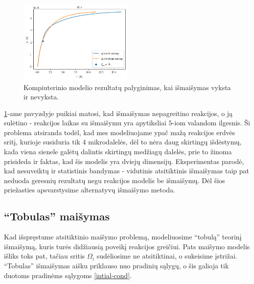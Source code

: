 \newpage
\begin{figure}[h!]
    \centering
    \includegraphics[width=0.5\textwidth]{../paper/assets/bad-mix-qnt-compare.png}
    \caption{Kompiuterinio modelio rezultatų palyginimas, kai išmaišymas vyksta ir nevyksta.  }
    \label{bad-mix-qnt-example}
\end{figure}
\ref{bad-mix-qnt-example}-ame pavyzdyje puikiai matosi, kad išmaišymas nepagreitino reakcijos, o ją sulėtino - reakcijos laikas su išmaišymu yra apytiksliai $5$-iom valandom ilgesnis. Ši problema atsiranda todėl, kad mes modeliuojame ypač mažą reakcijos erdvės sritį, kurioje susiduria tik 4 mikrodalelės, dėl to nėra daug skirtingų išdėstymų, kada viena sienele galėtų dalintis skirtingų medžiagų dalelės, prie to žinoma prisideda ir faktas, kad šis modelis yra dviejų dimensijų. Eksperimentas parodė, kad nesuveiktų ir statistinis bandymas - vidutinis atsitiktinis išmaišymas taip pat neduoda geresnių rezultatų negu reakcijos modelis be išmaišymų. Dėl šios priežasties apsvarstysime alternatyvų išmaišymo metoda.

\subsection{\enquote{Tobulas} maišymas}

Kad išspręstume atsitiktinio maišymo problemą, modeliuosime \enquote{tobulą} teorinį išmaišymą, kuris turės didžiausią poveikį reakcijos greičiui. Pats maišymo modelis išliks toks pat, tačiau sritis $\Omega_i$ sudėliosime ne atsitiktinai, o sukeisime įstrižai. \enquote{Tobulas} išmaišymas aišku priklauso nuo pradinių sąlygų, o šis galioja tik duotoms pradinėms sąlygoms \eqref{intial-cond}.


